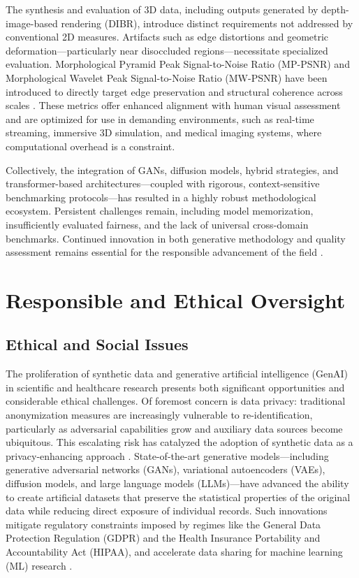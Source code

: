 The synthesis and evaluation of 3D data, including outputs generated by depth-image-based rendering (DIBR), introduce distinct requirements not addressed by conventional 2D measures. Artifacts such as edge distortions and geometric deformation—particularly near disoccluded regions—necessitate specialized evaluation. Morphological Pyramid Peak Signal-to-Noise Ratio (MP-PSNR) and Morphological Wavelet Peak Signal-to-Noise Ratio (MW-PSNR) have been introduced to directly target edge preservation and structural coherence across scales \cite{ref99}. These metrics offer enhanced alignment with human visual assessment and are optimized for use in demanding environments, such as real-time streaming, immersive 3D simulation, and medical imaging systems, where computational overhead is a constraint.

Collectively, the integration of GANs, diffusion models, hybrid strategies, and transformer-based architectures—coupled with rigorous, context-sensitive benchmarking protocols—has resulted in a highly robust methodological ecosystem. Persistent challenges remain, including model memorization, insufficiently evaluated fairness, and the lack of universal cross-domain benchmarks. Continued innovation in both generative methodology and quality assessment remains essential for the responsible advancement of the field \cite{ref87}\cite{ref88}\cite{ref89}\cite{ref90}\cite{ref93}\cite{ref95}\cite{ref101}\cite{ref102}.

\section{Responsible and Ethical Oversight}

\subsection{Ethical and Social Issues}

The proliferation of synthetic data and generative artificial intelligence (GenAI) in scientific and healthcare research presents both significant opportunities and considerable ethical challenges. Of foremost concern is data privacy: traditional anonymization measures are increasingly vulnerable to re-identification, particularly as adversarial capabilities grow and auxiliary data sources become ubiquitous. This escalating risk has catalyzed the adoption of synthetic data as a privacy-enhancing approach \cite{ref8}\cite{ref12}\cite{ref14}\cite{ref16}\cite{ref18}. State-of-the-art generative models—including generative adversarial networks (GANs), variational autoencoders (VAEs), diffusion models, and large language models (LLMs)—have advanced the ability to create artificial datasets that preserve the statistical properties of the original data while reducing direct exposure of individual records. Such innovations mitigate regulatory constraints imposed by regimes like the General Data Protection Regulation (GDPR) and the Health Insurance Portability and Accountability Act (HIPAA), and accelerate data sharing for machine learning (ML) research \cite{ref1}\cite{ref3}\cite{ref7}\cite{ref11}\cite{ref13}\cite{ref14}\cite{ref16}\cite{ref21}.


